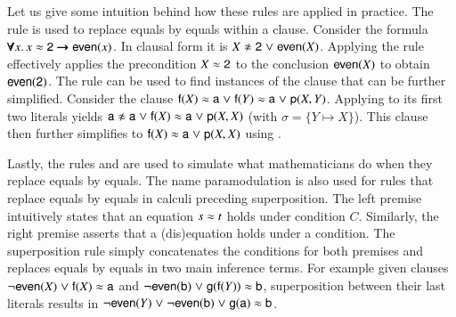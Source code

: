 \medskip
Let us give some intuition behind how these rules are applied in practice. The
 rule is used to replace equals by equals within a clause.
Consider the formula $\pmb{\forall} x.\,  x \approx \mathsf{2} \pmb{\rightarrow} \mathsf{even}(x)$. In
clausal form it is $X \noteq \cst{2} \llor \cst{even}(X)$. Applying the
 rule effectively applies the precondition $X \approx \mathsf{2}$ to the
conclusion $\mathsf{even}(X)$ to obtain $\mathsf{even}(\mathsf{2})$. The 
rule can be used to find instances of the clause that can be further simplified.
Consider the clause $\mathsf{f}(X) \approx \mathsf{a} \mathrel\lor \mathsf{f}(Y) \approx \mathsf{a} \mathrel\lor
\mathsf{p}(X, Y)$. Applying  to its first two literals yields $\cst{a}
\noteq \cst{a} \llor \cst{f}(X) \eq \cst{a} \llor \cst{p}(X, X)$ (with $\sigma = \{ Y \mapsto X \}$). This clause
then further simplifies to $\mathsf{f}(X) \approx \mathsf{a} \mathrel\lor \mathsf{p}(X, X)$ using .

Lastly, the rules  and  are used to simulate what
mathematicians do when they replace equals by equals. The name paramodulation is
also used for rules that replace equals by equals in calculi preceding superposition.  The left premise intuitively
states that an equation $s \approx t$ holds under condition $C$. Similarly, the right premise asserts that a (dis)equation holds
under a condition. The superposition rule simply concatenates the conditions for
both premises and replaces equals by equals in two main inference terms. For
example given clauses $\neg \mathsf{even}(X) \mathrel\lor \mathsf{f}(X) \approx \mathsf{a}$ and
$\neg \mathsf{even}(\mathsf{b}) \mathrel\lor \mathsf{g}(\mathsf{f}(Y)) \approx \mathsf{b}$, superposition
between their last literals results in $\neg \mathsf{even}(Y) \mathrel\lor \neg
\mathsf{even}(\mathsf{b}) \mathrel\lor \mathsf{g}(\mathsf{a}) \approx \mathsf{b}$.




